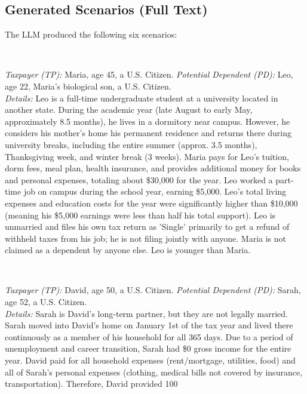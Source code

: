 \documentclass[11pt, letterpaper]{article}
\begin{document}
\subsection{Generated Scenarios (Full Text)}
The LLM produced the following six scenarios:

\begin{description}[style=unboxed, leftmargin=0pt] %
    \item[Scenario D1 (Dependent - QC, Student Rule)] \mbox{} \\ \begin{RaggedRight} %
    \textit{Taxpayer (TP):} Maria, age 45, a U.S. Citizen.
    \textit{Potential Dependent (PD):} Leo, age 22, Maria's biological son, a U.S. Citizen. \\
    \textit{Details:} Leo is a full-time undergraduate student at a university located in another state. During the academic year (late August to early May, approximately 8.5 months), he lives in a dormitory near campus. However, he considers his mother's home his permanent residence and returns there during university breaks, including the entire summer (approx. 3.5 months), Thanksgiving week, and winter break (3 weeks). Maria pays for Leo's tuition, dorm fees, meal plan, health insurance, and provides additional money for books and personal expenses, totaling about \$30,000 for the year. Leo worked a part-time job on campus during the school year, earning \$5,000. Leo's total living expenses and education costs for the year were significantly higher than \$10,000 (meaning his \$5,000 earnings were less than half his total support). Leo is unmarried and files his own tax return as 'Single' primarily to get a refund of withheld taxes from his job; he is not filing jointly with anyone. Maria is not claimed as a dependent by anyone else. Leo is younger than Maria.
    \end{RaggedRight}

    \item[Scenario D2 (Dependent - QR, Household Member)] \mbox{} \\ \begin{RaggedRight}
    \textit{Taxpayer (TP):} David, age 50, a U.S. Citizen.
    \textit{Potential Dependent (PD):} Sarah, age 52, a U.S. Citizen. \\
    \textit{Details:} Sarah is David's long-term partner, but they are not legally married. Sarah moved into David's home on January 1st of the tax year and lived there continuously as a member of his household for all 365 days. Due to a period of unemployment and career transition, Sarah had \$0 gross income for the entire year. David paid for all household expenses (rent/mortgage, utilities, food) and all of Sarah's personal expenses (clothing, medical bills not covered by insurance, transportation). Therefore, David provided 100%
    \end{RaggedRight}


\end{description}
\end{document}
